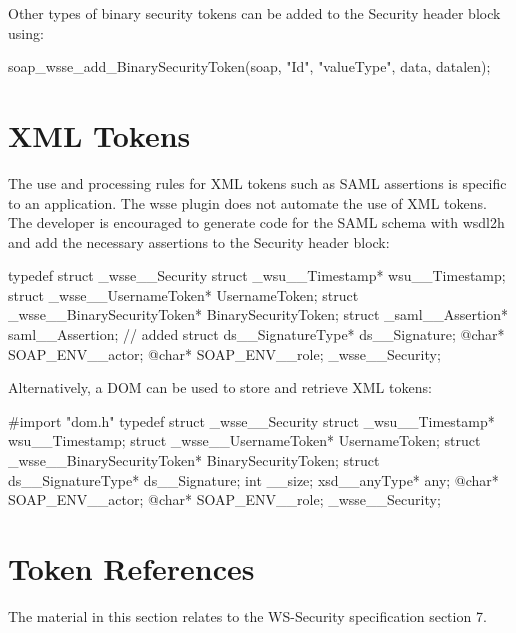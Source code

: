 Other types of binary security tokens can be added to the Security header block using:


\begin{DoxyCode}
    soap_wsse_add_BinarySecurityToken(soap, "Id", "valueType", data, datalen);
\end{DoxyCode}
\hypertarget{wsse_wsse_6_4}{}\section{XML Tokens}\label{wsse_wsse_6_4}
The use and processing rules for XML tokens such as SAML assertions is specific to an application. The wsse plugin does not automate the use of XML tokens. The developer is encouraged to generate code for the SAML schema with wsdl2h and add the necessary assertions to the Security header block:


\begin{DoxyCode}
typedef struct _wsse__Security
{       struct _wsu__Timestamp*                 wsu__Timestamp;
        struct _wsse__UsernameToken*            UsernameToken;
        struct _wsse__BinarySecurityToken*      BinarySecurityToken;
        struct _saml__Assertion*                saml__Assertion; // added
        struct ds__SignatureType*               ds__Signature;
        @char*                                  SOAP_ENV__actor;
        @char*                                  SOAP_ENV__role;
} _wsse__Security;
\end{DoxyCode}


Alternatively, a DOM can be used to store and retrieve XML tokens:


\begin{DoxyCode}
#import "dom.h"
typedef struct _wsse__Security
{       struct _wsu__Timestamp*                 wsu__Timestamp;
        struct _wsse__UsernameToken*            UsernameToken;
        struct _wsse__BinarySecurityToken*      BinarySecurityToken;
        struct ds__SignatureType*               ds__Signature;
        int                                     __size;
        xsd__anyType*                           any;
        @char*                                  SOAP_ENV__actor;
        @char*                                  SOAP_ENV__role;
} _wsse__Security;
\end{DoxyCode}
\hypertarget{wsse_wsse_7}{}\section{Token References}\label{wsse_wsse_7}
The material in this section relates to the WS-\/Security specification section 7.

